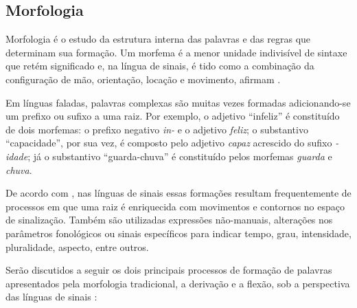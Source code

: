 \subsection{Morfologia}
\label{sec:linguistica-morfologia}

Morfologia é o estudo da estrutura interna das palavras e das regras que determinam sua formação. Um morfema é a menor unidade indivisível de sintaxe que retém significado e, na língua de sinais, é tido como a combinação da configuração de mão, orientação, locação e movimento, afirmam .


Em línguas faladas, palavras complexas são muitas vezes formadas adicionando-se um prefixo ou sufixo a uma raiz. Por exemplo, o adjetivo ``infeliz'' é constituído de dois morfemas: o prefixo negativo \textit{in-} e o adjetivo \textit{feliz}; o substantivo ``capacidade'', por sua vez, é composto pelo adjetivo \textit{capaz} acrescido do sufixo \textit{-idade}; já o substantivo ``guarda-chuva'' é constituído pelos morfemas \textit{guarda} e \textit{chuva}.



De acordo com , nas línguas de sinais essas formações resultam frequentemente de processos em que uma raiz é enriquecida com movimentos e contornos no espaço de sinalização. Também são utilizadas expressões não-manuais, alterações nos parâmetros fonológicos ou sinais específicos para indicar tempo, grau, intensidade, pluralidade, aspecto, entre outros.


Serão discutidos a seguir os dois principais processos de formação de palavras apresentados pela morfologia tradicional, a derivação e a flexão, sob a perspectiva das línguas de sinais \cite{quadros-2004-estudos-linguisticos,hill-2019-sign-languages,klima-1979-signs-of-language}:

